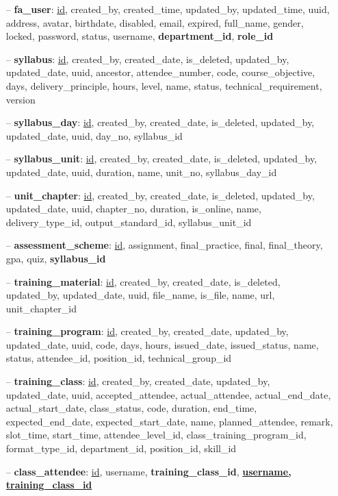 \documentclass[report.tex]{subfiles}
\begin{document}
\begin{enumerate}[nosep]
\item[--] \textbf{fa\_user}: \underline{id}, created\_by, created\_time, updated\_by, updated\_time, uuid, address, avatar, birthdate, disabled, email, expired, full\_name, gender, locked, password, status, username, \textbf{department\_id}, \textbf{role\_id}
\item[--] \textbf{syllabus}: \underline{id}, created\_by, created\_date, is\_deleted, updated\_by, updated\_date, uuid, ancestor, attendee\_number, code, course\_objective, days, delivery\_principle, hours, level, name, status, technical\_requirement, version
\item[--] \textbf{syllabus\_day}: \underline{id}, created\_by, created\_date, is\_deleted, updated\_by, updated\_date, uuid, day\_no, syllabus\_id
\item[--] \textbf{syllabus\_unit}: \underline{id}, created\_by, created\_date, is\_deleted, updated\_by, updated\_date, uuid, duration, name, unit\_no, syllabus\_day\_id
\item[--] \textbf{unit\_chapter}: \underline{id}, created\_by, created\_date, is\_deleted, updated\_by, updated\_date, uuid, chapter\_no, duration, is\_online, name, delivery\_type\_id, output\_standard\_id, syllabus\_unit\_id
\item[--] \textbf{assessment\_scheme}: \underline{id}, assignment, final\_practice, final, final\_theory, gpa, quiz, \textbf{syllabus\_id}
\item[--] \textbf{training\_material}: \underline{id}, created\_by, created\_date, is\_deleted, updated\_by, updated\_date, uuid, file\_name, is\_file, name, url, unit\_chapter\_id
\item[--] \textbf{training\_program}: \underline{id}, created\_by, created\_date, updated\_by, updated\_date, uuid, code, days, hours, issued\_date, issued\_status, name, status, attendee\_id, position\_id, technical\_group\_id
\item[--] \textbf{training\_class}: \underline{id}, created\_by, created\_date, updated\_by, updated\_date, uuid, accepted\_attendee, actual\_attendee, actual\_end\_date, actual\_start\_date, class\_status, code, duration, end\_time, expected\_end\_date, expected\_start\_date, name, planned\_attendee, remark, slot\_time, start\_time, attendee\_level\_id, class\_training\_program\_id, format\_type\_id, department\_id, position\_id, skill\_id
\item[--] \textbf{class\_attendee}: \underline{id}, username, \textbf{training\_class\_id}, \textbf{\underline{username, training\_class\_id}}

\end{enumerate}
\end{document}
